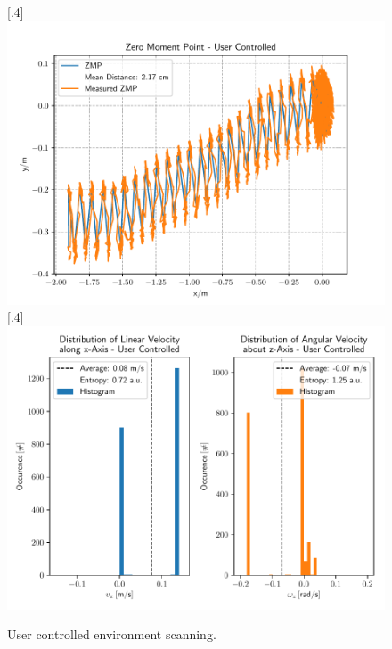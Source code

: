 \begin{figure}[h!]
	\centering
	[.4\linewidth]{\includegraphics[scale=.35]{chapters/05_experiments/01_user_controlled_walking/02_test_environment/out_of_sight_walk_01_zmp.pdf}}
	[.4\linewidth]{\includegraphics[scale=.35]{chapters/05_experiments/01_user_controlled_walking/02_test_environment/out_of_sight_walk_01_entropy.pdf}}
	\caption{User controlled environment scanning.}
	\label{fig::512_uc_sight}
\end{figure} 